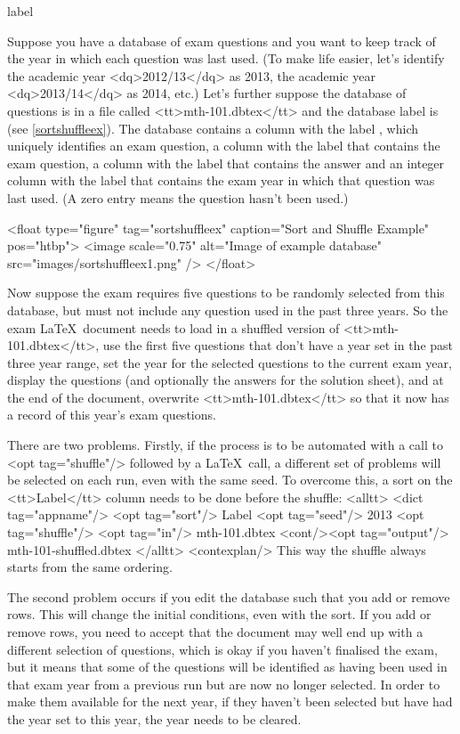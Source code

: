 \begin{example}{label}{}

   Suppose you have a database of exam questions and you want to keep
   track of the year in which each question was last used. (To make life
   easier, let's identify the academic year <dq>2012/13</dq> as 2013, the
   academic year <dq>2013/14</dq> as 2014, etc.) Let's further suppose the
   database of questions is in a file called <tt>mth-101.dbtex</tt>
   and the database label is  (see 
   \autoref{sortshuffleex}). The database 
   contains a column with the label , which
   uniquely identifies an exam question, a column with the label
    that contains the exam question, a column
   with the label  that contains the answer and
   an integer column with the label  that contains the
   exam year in which that question was last used. (A zero entry means the
   question hasn't been used.)

   <float type="figure" tag="sortshuffleex" caption="Sort and Shuffle Example" pos="htbp">
      <image scale="0.75" alt="Image of example database" src="images/sortshuffleex1.png" />
   </float>

   Now suppose the exam requires five questions to be randomly selected from 
   this database, but must not include any question used in the past three 
   years. So the exam \LaTeX\ document needs to load in a shuffled
   version of <tt>mth-101.dbtex</tt>, use the first five questions that don't
   have a year set in the past three year range, set the year for the
   selected questions to the current exam year, display the questions (and
   optionally the answers for the solution sheet), and at the end of the
   document, overwrite <tt>mth-101.dbtex</tt> so that it now has 
   a record of this year's exam questions.


   There are two problems. Firstly, if the process is to be automated
   with a call to  <opt tag="shuffle"/> followed by 
   a \LaTeX\ call, a different set of problems will be selected
   on each run, even with the same seed. To overcome this, a sort on 
   the <tt>Label</tt> column needs to be done before the shuffle:
<alltt>
<dict tag="appname"/> <opt tag="sort"/> Label <opt tag="seed"/> 2013 <opt tag="shuffle"/> <opt tag="in"/> mth-101.dbtex <cont/><opt tag="output"/> mth-101-shuffled.dbtex
</alltt>
   <contexplan/>
   This way the shuffle always starts from the same ordering.


   The second problem occurs if you edit the database such that you add or
   remove rows. This will change the initial conditions, even with the sort.
   If you add or remove rows, you need to accept that the document may well
   end up with a different selection of questions, which is okay if
   you haven't finalised the exam, but it means that some of the questions
   will be identified as having been used in that exam year from 
   a previous run but are now no longer selected. In order to make them
   available for the next year, if they haven't been selected but have had the
   year set to this year, the year needs to be cleared.



\end{example}
